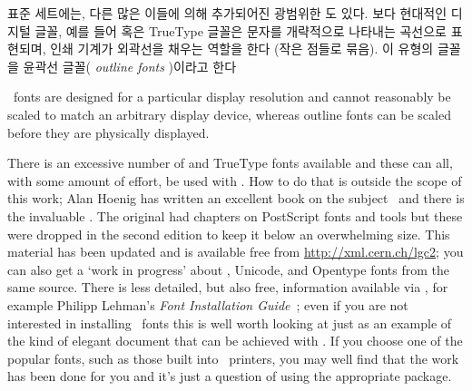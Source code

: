 표준 세트에는, 다른 많은 이들에 의해 추가되어진 광범위한 \metafont{} 도 있다.
보다 현대적인 디지털 글꼴, 예를 들어 \pscript{} 혹은 TrueType 글꼴은 문자를 개략적으로 나타내는 곡선으로 표현되며, 인쇄 기계가 외곽선을 채우는 역할을 한다 (작은 점들로 묶음).
이 유형의 글꼴을 윤곽선 글꼴( \emph{outline fonts} )이라고 한다

\metafont\ fonts
are designed for a particular display resolution and cannot reasonably 
be scaled to match an arbitrary display device, whereas outline fonts can be 
scaled before they are physically displayed.

    There is an excessive number of \pscript{}
and TrueType
fonts available 
and these can all, with some amount of effort, be used with \ltx. How to do
that is outside the scope of this work; Alan Hoenig has written an excellent
book on the subject~\cite{HOENIG98} and there is the invaluable 
 \cite[Chapter 7 Fonts and Encodings]{COMPANION}. 
The original  had chapters on PostScript
fonts and tools but these were dropped in the second edition to keep it below
an overwhelming size. This material has been updated and is available
free from \url{http://xml.cern.ch/lgc2}; you can also get a 
`work in progress'
about \pixxetx, Unicode, and 
Opentype
fonts from the same source. 
There is less detailed, but also free, 
information available via \pixctan, for example Philipp Lehman's 
\textit{Font Installation Guide}~\cite{FONTINST}; even if you are not 
interested in
installing \pscript\ fonts this is well worth looking at just as an
example of the kind of elegant document that can be achieved with \ltx.
If you choose one of the popular
\pscript{} fonts, such as those built 
into \ixpscript\ printers, you may 
well find that the work has been done for you and it's just a question
of using the appropriate 
package.%
